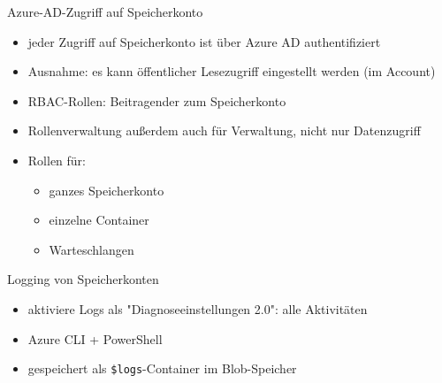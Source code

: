 \begin{flashcard}[Definition]{Azure-AD-Zugriff auf Speicherkonto}
    \begin{itemize}
        \item jeder Zugriff auf Speicherkonto ist über Azure AD authentifiziert
        \item Ausnahme: es kann öffentlicher Lesezugriff eingestellt werden (im Account)
        \item RBAC-Rollen: Beitragender zum Speicherkonto
        \item Rollenverwaltung außerdem auch für Verwaltung, nicht nur Datenzugriff
        \item Rollen für:
            \begin{itemize}
                \item ganzes Speicherkonto
                \item einzelne Container
                \item Warteschlangen
            \end{itemize}
    \end{itemize}
\end{flashcard}


\begin{flashcard}[Definition]{Logging von Speicherkonten}
    \begin{itemize}
        \item aktiviere Logs als "Diagnoseeinstellungen 2.0": alle Aktivitäten
        \item Azure CLI + PowerShell
        \item gespeichert als \texttt{\$logs}-Container im Blob-Speicher
    \end{itemize}
\end{flashcard}


